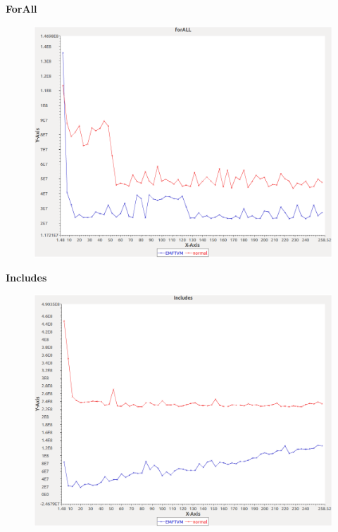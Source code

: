 \noindent\textbf{ForAll}

\begin{figure}[h]
\centering
\includegraphics[width=\textwidth]{graphs/bag/forALL}
\end{figure}
\pagebreak

\noindent\textbf{Includes}

\begin{figure}[h]
\centering
\includegraphics[width=\textwidth]{graphs/bag/Includes}
\end{figure}
\pagebreak


